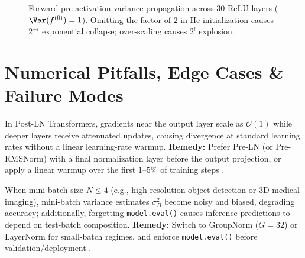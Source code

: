 \documentclass[../../../../master.tex]{subfiles}
\begin{document}
\begin{figure}[htbp]
\centering
{}
\caption{Forward pre-activation variance propagation across 30 ReLU layers ($\Var(f^{(0)})=1$). Omitting the factor of $2$ in He initialization causes $2^{-l}$ exponential collapse; over-scaling causes $2^l$ explosion.}
\label{fig:normres:var_prop}
\end{figure}

\section{Numerical Pitfalls, Edge Cases \& Failure Modes}
\label{sec:normres:pitfalls}

\begin{pitfall}
In Post-LN Transformers, gradients near the output layer scale as $\mathcal{O}(1)$ while deeper layers receive attenuated updates, causing divergence at standard learning rates without a linear learning-rate warmup. \textbf{Remedy:} Prefer Pre-LN (or Pre-RMSNorm) with a final normalization layer before the output projection, or apply a linear warmup over the first $1$--$5\%$ of training steps .
\end{pitfall}

\begin{pitfall}
When mini-batch size $N \le 4$ (e.g., high-resolution object detection or 3D medical imaging), mini-batch variance estimates $\sigma_B^2$ become noisy and biased, degrading accuracy; additionally, forgetting \texttt{model.eval()} causes inference predictions to depend on test-batch composition. \textbf{Remedy:} Switch to GroupNorm ($G=32$) or LayerNorm for small-batch regimes, and enforce \texttt{model.eval()} before validation/deployment .
\end{pitfall}
\end{document}
